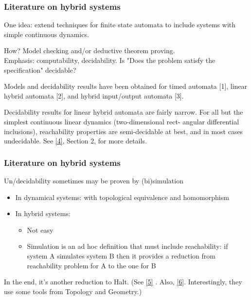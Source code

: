 \documentclass{beamer}
\begin{document}
\begin{frame}
	\frametitle{Literature on hybrid systems}
	 One idea: extend techniques for finite state automata to include systems with simple continuous dynamics. \newline
	 
	 How? Model checking and/or deductive theorem proving. \\
	 Emphasis: computability, decidability. Is "Does the problem satisfy the specification" decidable? \newline
	 
	Models and decidability
results have been obtained for timed automata [1], linear hybrid automata [2], and hybrid
input/output automata [3]. \newline

Decidability results for linear hybrid automata are
fairly narrow.  For all but the simplest continuous linear dynamics (two-dimensional rect-
angular differential inclusions), reachability properties are semi-decidable at best, and in
most cases undecidable. See \href{<https://www.irif.fr/~asarin/papers/incl.pdf>}{[4]}, Section 2, for more details.
\end{frame}


\begin{frame}
\frametitle{Literature on hybrid systems}

Un/decidability sometimes may be proven by (bi)simulation

\begin{itemize}
	\item In dynamical systems: with topological equivalence and homomorphism
	\item In hybrid systems:
		\begin{itemize}
			\item Not easy
			\item Simulation is an ad hoc definition that must include reachability: if system A simulates system B then it provides a reduction from reachability problem for A to the one for B
		\end{itemize}
\end{itemize}

In the end, it's another reduction to Halt. 
(See \href{<http://www.sciencedirect.com/science/article/pii/030439759400228B>}{[5]}
. Also, \href{http://www.sciencedirect.com/science/article/pii/S0890540112000028}{[6]}.
Interestingly, they use some tools from Topology and Geometry.)\end{frame}
\end{document}
